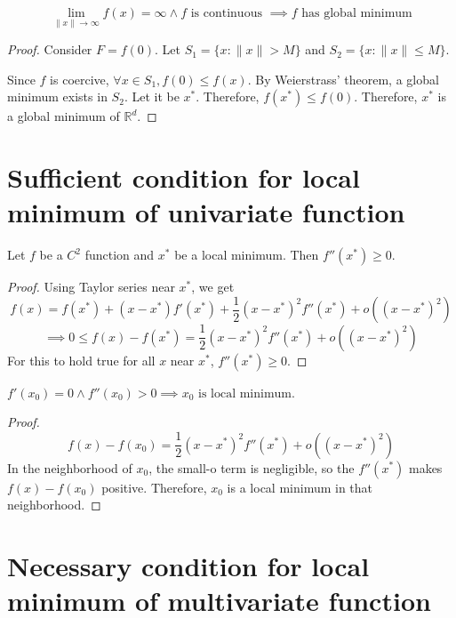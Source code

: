 \begin{theorem}
\[ \lim_{\|x\| \rightarrow \infty} f(x) = \infty \wedge f \textrm{ is continuous }
\implies f \textrm{ has global minimum} \]
\end{theorem}
\begin{proof}
Consider $F = f(0)$.
Let $S_1 = \{x: \|x\| > M \}$ and $S_2 = \{x: \|x\| \le M \}$.

Since $f$ is coercive, $\forall x \in S_1, f(0) \le f(x)$.
By Weierstrass' theorem, a global minimum exists in $S_2$. Let it be $x^*$.
Therefore, $f(x^*) \le f(0)$.
Therefore, $x^*$ is a global minimum of $\mathbb{R}^d$.
\end{proof}

\section{Sufficient condition for local minimum of univariate function}

\begin{theorem} Let $f$ be a $C^2$ function and $x^*$ be a local minimum.
Then $f''(x^*) \ge 0$. \end{theorem}
\begin{proof}
Using Taylor series near $x^*$, we get
\[ f(x) = f(x^*) + (x-x^*)f'(x^*) + \frac{1}{2}(x-x^*)^2f''(x^*) + o((x-x^*)^2) \]
\[ \implies 0 \le f(x) - f(x^*) = \frac{1}{2}(x-x^*)^2f''(x^*) + o((x-x^*)^2) \]
For this to hold true for all $x$ near $x^*$, $f''(x^*) \ge 0$.
\end{proof}

\begin{theorem}
$f'(x_0) = 0 \wedge f''(x_0) > 0 \implies x_0 \textrm{ is local minimum}$.
\end{theorem}
\begin{proof}
\[ f(x) - f(x_0) = \frac{1}{2}(x-x^*)^2f''(x^*) + o((x-x^*)^2) \]
In the neighborhood of $x_0$, the small-o term is negligible,
so the $f''(x^*)$ makes $f(x) - f(x_0)$ positive.
Therefore, $x_0$ is a local minimum in that neighborhood.
\end{proof}

\section{Necessary condition for local minimum of multivariate function}

